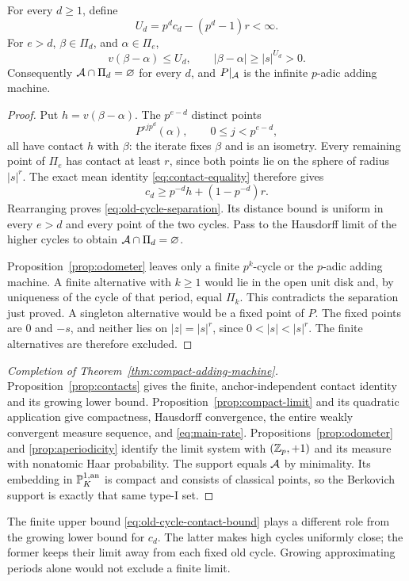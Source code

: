 \begin{proposition}
\label{prop:aperiodicity}
For every $d\ge1$, define
\begin{equation}\label{eq:old-cycle-contact-bound}
 U_d=p^d c_d-(p^d-1)r<\infty.
\end{equation}
For $e>d$, $\beta\in\Pi_d$, and $\alpha\in\Pi_e$,
\begin{equation}\label{eq:old-cycle-separation}
 v(\beta-\alpha)\le U_d,\qquad
 |\beta-\alpha|\ge |s|^{U_d}>0.
\end{equation}
Consequently $\mathcal A\cap\Pi_d=\varnothing$ for every $d$, and
$P|_\mathcal A$ is the infinite $p$-adic adding machine.
\end{proposition}
\begin{proof}
Put $h=v(\beta-\alpha)$. The $p^{e-d}$ distinct points
\[
 P^{\circ jp^d}(\alpha),\qquad 0\le j<p^{e-d},
\]
all have contact $h$ with $\beta$: the iterate fixes $\beta$ and
is an isometry. Every remaining point of $\Pi_e$ has contact at
least $r$, since both points lie on the sphere of radius $|s|^r$.
The exact mean identity \eqref{eq:contact-equality} therefore gives
\[
 c_d\ge p^{-d}h+(1-p^{-d})r.
\]
Rearranging proves \eqref{eq:old-cycle-separation}. Its distance
bound is uniform in every $e>d$ and every point of the two cycles.
Pass to the Hausdorff limit of the higher cycles to obtain
$\mathcal A\cap\Pi_d=\varnothing$.

Proposition~\ref{prop:odometer} leaves only a finite $p^k$-cycle
or the $p$-adic adding machine. A finite alternative with $k\ge1$
would lie in the open unit disk and, by uniqueness of the cycle
of that period, equal $\Pi_k$. This contradicts the separation
just proved. A singleton alternative would be a fixed point of
$P$. The fixed points are $0$ and $-s$, and neither lies on
$|z|=|s|^r$, since $0<|s|<|s|^r$. The finite alternatives are
therefore excluded.
\end{proof}

\begin{proof}[Completion of Theorem~\ref{thm:compact-adding-machine}]
Proposition~\ref{prop:contacts} gives the finite, anchor-independent
contact identity and its growing lower bound.
Proposition~\ref{prop:compact-limit} and its quadratic application
give compactness, Hausdorff convergence, the entire weakly convergent
measure sequence, and \eqref{eq:main-rate}.
Propositions~\ref{prop:odometer} and \ref{prop:aperiodicity} identify
the limit system with $(\mathbb Z_p,+1)$ and its measure with nonatomic
Haar probability. The support equals $\mathcal A$ by minimality. Its
embedding in $\mathbb P^{1,\mathrm{an}}_K$ is compact and consists of classical points,
so the Berkovich support is exactly that same type-I set.
\end{proof}

The finite upper bound \eqref{eq:old-cycle-contact-bound} plays a
different role from the growing lower bound for $c_d$. The latter
makes high cycles uniformly close; the former keeps their limit
away from each fixed old cycle. Growing approximating periods alone
would not exclude a finite limit.

